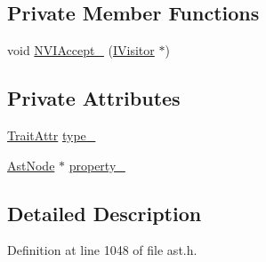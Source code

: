 \subsection*{Private Member Functions}
\begin{DoxyCompactItemize}
\item 
void \hyperlink{classmocha_1_1_trait_member_ad008bf35f880ed657bbb796fe755077b}{NVIAccept\_\-} (\hyperlink{classmocha_1_1_i_visitor}{IVisitor} $\ast$)
\end{DoxyCompactItemize}
\subsection*{Private Attributes}
\begin{DoxyCompactItemize}
\item 
\hyperlink{classmocha_1_1_trait_member_a3186269fa0b78f72814a117018a7b40d}{TraitAttr} \hyperlink{classmocha_1_1_trait_member_a972c5f4718c2aa74ae626724521afd3c}{type\_\-}
\item 
\hyperlink{classmocha_1_1_ast_node}{AstNode} $\ast$ \hyperlink{classmocha_1_1_trait_member_a7a7c0a4c2720e5cfb729bfa734bfb04e}{property\_\-}
\end{DoxyCompactItemize}


\subsection{Detailed Description}


Definition at line 1048 of file ast.h.



